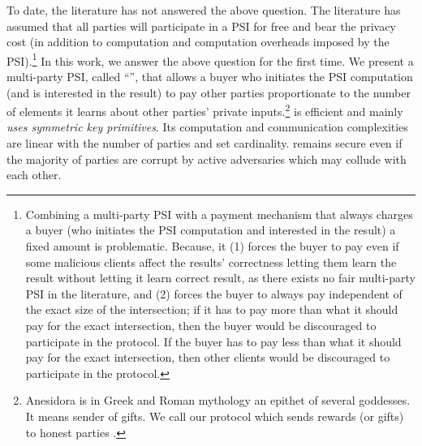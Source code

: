 To date, the literature has not answered the above question. The literature has assumed that all parties will participate in a PSI for free and bear the privacy cost (in addition to computation and computation overheads imposed by the PSI).\footnote{Combining a multi-party PSI with a payment mechanism that always charges a buyer (who initiates the PSI computation and interested in the result) a fixed amount is problematic. Because, it (1) forces the buyer to pay even if some malicious clients affect the results' correctness letting them learn the result without letting it learn correct result, as there exists no fair multi-party PSI in the literature, and (2) forces the buyer to always pay independent  of the exact size of the intersection; if it has to pay more than what it should pay for the exact intersection, then the buyer would be discouraged to participate in the protocol. If the buyer has to pay less than what it should pay for the exact intersection, then other  clients would be discouraged to participate in the protocol.} 
%
In this work, we answer the above question for the first time. We present a multi-party PSI, called ``\withRew'', that allows a buyer who initiates the PSI computation (and is interested in the result) to pay other parties proportionate to the number of elements it learns about other parties' private inputs.\footnote{Anesidora is in Greek and Roman mythology an epithet of several goddesses. It means sender of gifts. We call our protocol which sends rewards (or gifts) to honest parties \withRew.}  \withRew is efficient and mainly \emph{uses symmetric key primitives}.  Its computation and communication complexities are linear with the number of parties and set cardinality. \withRew remains secure even if the majority of parties are corrupt by active adversaries which may collude with each other. 










